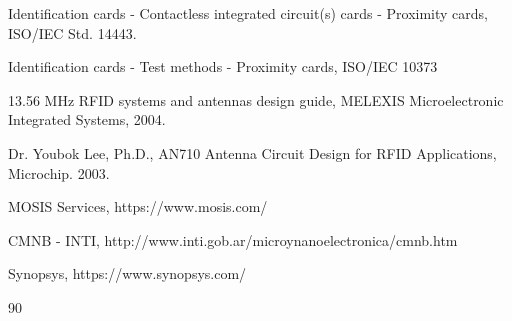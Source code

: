 \documentclass{article} %
\begin{document}
\begin{multicols}{2}
{\begin{thebibliography}{99}
	Identification cards - Contactless integrated circuit(s) cards - Proximity cards, ISO/IEC Std. 14443.

	Identification cards - Test methods - Proximity cards, ISO/IEC 10373

	13.56 MHz RFID systems and antennas design guide, MELEXIS Microelectronic Integrated Systems, 2004.

	Dr. Youbok Lee, Ph.D., AN710 Antenna Circuit Design for RFID Applications, Microchip. 2003.

	MOSIS Services, https://www.mosis.com/

	CMNB - INTI, http://www.inti.gob.ar/microynanoelectronica/cmnb.htm

	Synopsys, https://www.synopsys.com/

\end{thebibliography}{90}
\noindent

} 

\end{multicols}
\end{document}
